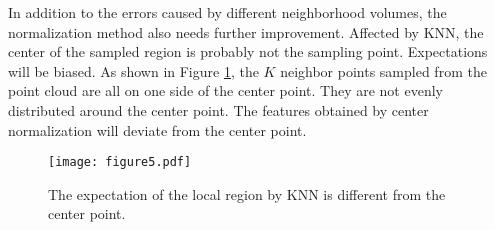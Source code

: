 \documentclass[10pt,twocolumn,letterpaper]{article}
\begin{document}
        In addition to the errors caused by different neighborhood volumes, the normalization method also needs further improvement. Affected by KNN, the center of the sampled region is probably not the sampling point. Expectations will be biased. As shown in Figure \ref{fig:5}, the $K$ neighbor points sampled from the point cloud are all on one side of the center point. They are not evenly distributed around the center point. The features obtained by center normalization will deviate from the center point.
        \begin{figure}[!htb]
        \centering
        \texttt{[image: figure5.pdf]}
        \caption{The expectation of the local region by KNN is different from the center point.}
        \label{fig:5}
        \end{figure}
\end{document}
